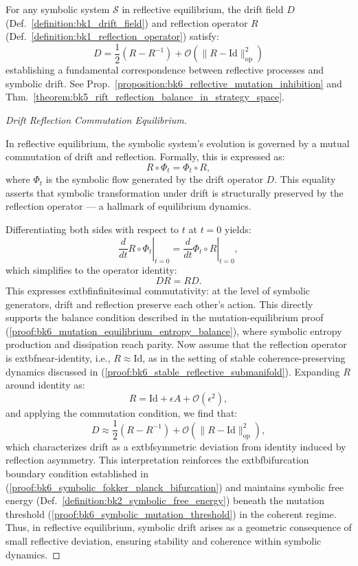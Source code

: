 \begin{proposition}
\label{proposition:bk6_drift_reflection_correspondence}
For any symbolic system $\mathcal{S}$ in reflective equilibrium, the drift field $D$ (Def.~\ref{definition:bk1_drift_field}) and reflection operator $R$ (Def.~\ref{definition:bk1_reflection_operator}) satisfy:
\begin{equation}
D = \frac{1}{2}(R - R^{-1}) + \mathcal{O}(\|R - \text{Id}\|_{\text{op}}^2)
\end{equation}
establishing a fundamental correspondence between reflective processes and symbolic drift.
See Prop.~\ref{proposition:bk6_reflective_mutation_inhibition} and Thm.~\ref{theorem:bk5_rift_reflection_balance_in_strategy_space}.
\begin{proof}[Drift Reflection Commutation Equilibrium]
\label{proof:bk6_drift_reflection_commutation_equilibrium}
\leavevmode

In reflective equilibrium, the symbolic system’s evolution is governed by a mutual commutation of drift and reflection. Formally, this is expressed as:
\[
R \circ \Phi_t = \Phi_t \circ R,
\]
where \( \Phi_t \) is the symbolic flow generated by the drift operator \( D \). This equality asserts that symbolic transformation under drift is structurally preserved by the reflection operator — a hallmark of equilibrium dynamics.

Differentiating both sides with respect to \( t \) at \( t = 0 \) yields:
\[
\left.\frac{d}{dt} R \circ \Phi_t \right|_{t=0} = \left. \frac{d}{dt} \Phi_t \circ R \right|_{t=0},
\]
which simplifies to the operator identity:
\[
DR = RD.
\]
This expresses 	extbf{infinitesimal commutativity}: at the level of symbolic generators, drift and reflection preserve each other’s action. This directly supports the balance condition described in the mutation-equilibrium proof (\ref{proof:bk6_mutation_equilibrium_entropy_balance}), where symbolic entropy production and dissipation reach parity.
Now assume that the reflection operator is 	extbf{near-identity}, i.e., \( R \approx \text{Id} \), as in the setting of stable coherence-preserving dynamics discussed in (\ref{proof:bk6_stable_reflective_submanifold}). Expanding \( R \) around identity as:
\[
R = \text{Id} + \epsilon A + \mathcal{O}(\epsilon^2),
\]
and applying the commutation condition, we find that:
\[
D \approx \frac{1}{2}(R - R^{-1}) + \mathcal{O}(\|R - \text{Id}\|_{\text{op}}^2),
\]
which characterizes drift as a 	extbf{symmetric deviation} from identity induced by reflection asymmetry. This interpretation reinforces the 	extbf{bifurcation boundary condition} established in (\ref{proof:bk6_symbolic_fokker_planck_bifurcation}) and maintains symbolic free energy (Def.~\ref{definition:bk2_symbolic_free_energy}) beneath the mutation threshold (\ref{proof:bk6_symbolic_mutation_threshold}) in the coherent regime.
Thus, in reflective equilibrium, symbolic drift arises as a geometric consequence of small reflective deviation, ensuring stability and coherence within symbolic dynamics.
\end{proof}
\end{proposition}
